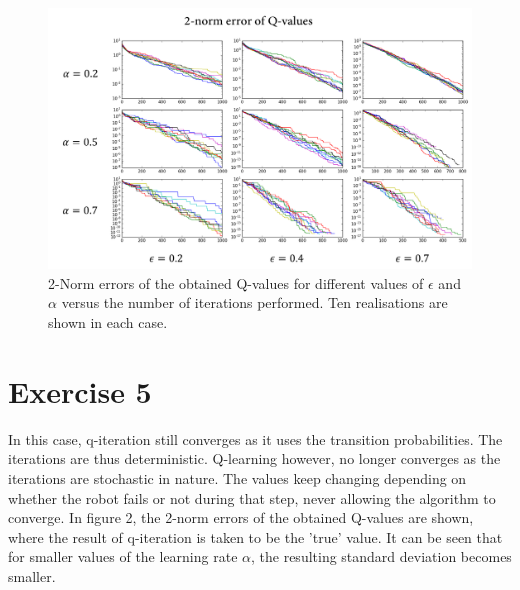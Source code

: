 \documentclass [a4paper] {report}
\begin{document}
	\begin{figure}[H]
		\begin{center}
			\includegraphics[scale=0.5]{Images/QErrors.png}
			\caption{2-Norm errors of the obtained Q-values for different values of $\epsilon$ and $\alpha$ versus the number of iterations performed. Ten realisations are shown in each case.}
			\label{QErrors}
		\end{center}
	\end{figure}
	
	\section*{Exercise 5}
	In this case, q-iteration still converges as it uses the transition probabilities. The iterations are thus deterministic. Q-learning however, no longer converges as the iterations are stochastic in nature. The values keep changing depending on whether the robot fails or not during that step, never allowing the algorithm to converge. In figure 2, the 2-norm errors of the obtained Q-values are shown, where the result of q-iteration is taken to be the 'true' value. It can be seen that for smaller values of the learning rate $\alpha$, the resulting standard deviation becomes smaller.
	
\end{document}
